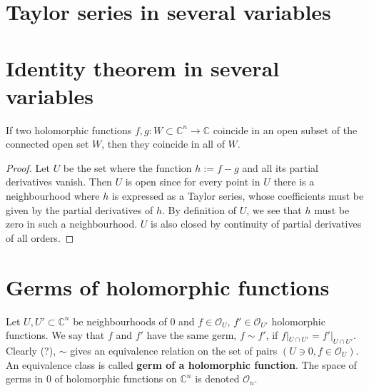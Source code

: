 \section{Taylor series in several variables}
\label{section-Taylor-series-in-several-variables}

\section{Identity theorem in several variables}
\label{section-identity-theorem-in-several-variables}

\begin{theorem}
\label{theorem-identity-several-variables}
\begin{reference}
\cite[Proposition 1.28]{lec}
\end{reference}
If two holomorphic functions $f,g:W\subset \mathbb{C}^n \to \mathbb{C}$ coincide
in an open subset of the connected open set $W$, 
then they coincide in all of $W$.
\end{theorem}

\begin{proof}
Let $U$ be the set where the function $h:=f-g$ and all its partial derivatives
vanish. Then $U$ is open since for every point in $U$ there is a neighbourhood
where $h$ is expressed as a Taylor series, whose coefficients must be given by
the partial derivatives of $h$. By definition of $U$, we see that $h$ must be
zero in such a neighbourhood. $U$ is also closed by continuity of partial
derivatives of all orders. 
\end{proof}

\section{Germs of holomorphic functions}
\label{section-germs-of-holomorphic-functions}

\begin{definition}
\label{definition-germ-of-holomorphic-function}
Let $U,U' \subset \mathbb{C}^n$ be neighbourhoods of $0$ and $f \in
\mathcal{O}_U$, $f'\in\mathcal{O}_{U'}$ holomorphic functions. We say that $f$
and $f'$ have the same germ, $f\sim f'$, if $f|_{U\cap U'}=f'|_{U\cap U'}$.
Clearly (?), $\sim$ gives an equivalence relation on the set of pairs $(U\ni 0,
f\in \mathcal{O}_U)$. An equivalence class is called {\bf germ of a holomorphic
function}. The space of germs in $0$ of holomorphic functions on $\mathbb{C}^n$
is denoted $\mathcal{O}_n$.
\end{definition}

